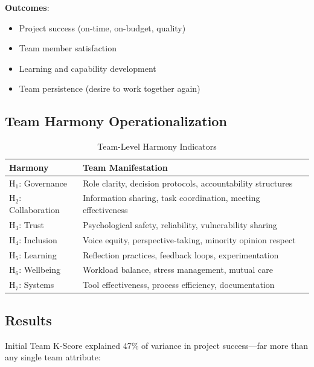 \documentclass[12pt,a4paper]{article}
\begin{document}
\textbf{Outcomes}:
\begin{itemize}
    \item Project success (on-time, on-budget, quality)
    \item Team member satisfaction
    \item Learning and capability development
    \item Team persistence (desire to work together again)
\end{itemize}

\subsection{Team Harmony Operationalization}

\begin{table}[H]
\centering
\caption{Team-Level Harmony Indicators}
\label{tab:team_indicators}
\begin{tabular}{ll}
\toprule
\textbf{Harmony} & \textbf{Team Manifestation} \\
\midrule
H$_1$: Governance & Role clarity, decision protocols, accountability structures \\
H$_2$: Collaboration & Information sharing, task coordination, meeting effectiveness \\
H$_3$: Trust & Psychological safety, reliability, vulnerability sharing \\
H$_4$: Inclusion & Voice equity, perspective-taking, minority opinion respect \\
H$_5$: Learning & Reflection practices, feedback loops, experimentation \\
H$_6$: Wellbeing & Workload balance, stress management, mutual care \\
H$_7$: Systems & Tool effectiveness, process efficiency, documentation \\
\bottomrule
\end{tabular}
\end{table}

\subsection{Results}

Initial Team K-Score explained 47\% of variance in project success---far more than any single team attribute:
\end{document}
